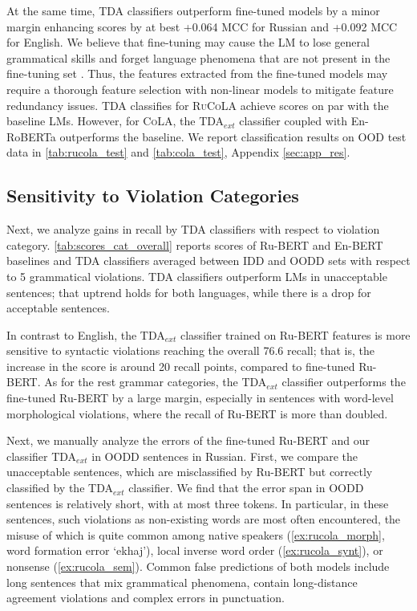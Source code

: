 \documentclass[11pt]{article}
\begin{document}
At the same time, TDA classifiers outperform fine-tuned models by a minor margin enhancing scores by 
at best +0.064 MCC for Russian and +0.092 MCC for English. 
We believe that fine-tuning may cause the LM to lose general grammatical skills and forget language phenomena that are not present in the fine-tuning set \cite{miaschi-etal-2020-linguistic}.
Thus, the features extracted from the fine-tuned models may require a thorough feature selection with non-linear models to mitigate feature redundancy issues.
TDA classifies for \textsc{RuCoLA} achieve scores on par with the baseline LMs. However,  for \textsc{CoLA}, the  TDA$_{ext}$ classifier coupled with En-RoBERTa outperforms the baseline.
We report classification results on OOD test data in \autoref{tab:rucola_test} and \autoref{tab:cola_test}, Appendix \ref{sec:app_res}.



\subsection{Sensitivity to Violation Categories}
\label{sec:per_cat_sensitivity}



Next, we analyze gains in recall by TDA classifiers with respect to violation category. 
\autoref{tab:scores_cat_overall} reports scores of Ru-BERT and En-BERT baselines and TDA classifiers averaged between IDD and OODD sets with respect to 5  grammatical violations.
TDA classifiers outperform LMs in unacceptable sentences; that uptrend holds for both languages, while there is a drop for acceptable sentences.

In contrast to English, the TDA$_{ext}$ classifier trained on Ru-BERT features is more sensitive to syntactic violations reaching the overall 76.6 recall; that is, the increase in the score is around 20 recall points, compared to fine-tuned Ru-BERT. 
As for the rest grammar categories, the TDA$_{ext}$  classifier outperforms the fine-tuned Ru-BERT by a large margin, especially in sentences with word-level morphological violations, where the recall of Ru-BERT is more than doubled.


Next, we manually analyze the errors of the fine-tuned Ru-BERT and our classifier TDA$_{ext}$ in OODD sentences in Russian.
First, we compare the unacceptable sentences, which are  misclassified by Ru-BERT but correctly classified by the TDA$_{ext}$ classifier. 
We find  that the error span in OODD sentences is relatively short, with at most three tokens.
In particular, in these sentences, such violations as non-existing words are most often encountered, the misuse of which is quite common among native speakers
(\ref{ex:rucola_morph}, word formation error `ekhaj'), local inverse word order (\ref{ex:rucola_synt}), or nonsense (\ref{ex:rucola_sem}). 
Common false predictions of both models include long sentences that mix grammatical phenomena, contain long-distance agreement violations and complex errors in punctuation.
\end{document}
